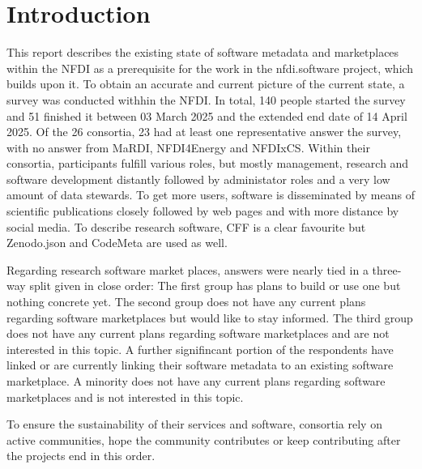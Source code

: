 \documentclass[headsepline,titlepage,twoside,12pt,toc=flat,headings=normal]{scrreprt}
\author{\theauthor}
\date{\thedate}
\title{\thetitle}
\subtitle{Deliverable 2.2}
\begin{document}
\maketitle
\imprint

\chapter*{Introduction}\label{ch:introduction}

This report describes the existing state of software metadata and marketplaces within the NFDI as a prerequisite for the work in the nfdi.software project, which builds upon it.
To obtain an accurate and current picture of the current state, a survey was conducted withhin the NFDI.
In total, 140 people started the survey and 51 finished it between 03 March 2025 and the extended end date of 14 April 2025.
Of the 26 consortia, 23 had at least one representative answer the survey, with no answer from MaRDI, NFDI4Energy and NFDIxCS.
Within their consortia, participants fulfill various roles, but mostly management, research and software development distantly followed by administator roles and a very low amount of data stewards.
To get more users, software is disseminated by means of scientific publications closely followed by web pages and with more distance by social media.
To describe research software, \ac{CFF} is a clear favourite but Zenodo.json and CodeMeta are used as well.

Regarding research software market places, answers were nearly tied in a three-way split given in close order:
The first group has plans to build or use one but nothing concrete yet.
The second group does not have any current plans regarding software marketplaces but would like to stay informed.
The third group does not have any current plans regarding software marketplaces and are not interested in this topic.
A further signifincant portion of the respondents have linked or are currently linking their software metadata to an existing software marketplace.
A minority does not have any current plans regarding software marketplaces and is not interested in this topic.

To ensure the sustainability of their services and software, consortia rely on active communities, hope the community contributes or keep contributing after the projects end in this order.
\end{document}
